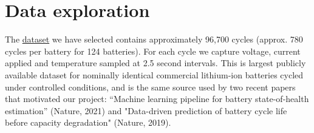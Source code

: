 \documentclass{article}
\begin{document}
\section{Data exploration}
The \href{https://data.matr.io/1/projects/5c48dd2bc625d700019f3204}{dataset} we have selected contains approximately 96,700 cycles (approx. 780 cycles per battery for 124 batteries). For each cycle we capture voltage, current applied and temperature sampled at 2.5 second intervals. This is largest publicly available dataset for nominally identical commercial lithium-ion batteries cycled under controlled conditions, and is the same source used by two recent papers that motivated our project: “Machine learning pipeline for battery state-of-health estimation” (Nature, 2021)\cite{roman2021machine} and "Data-driven prediction of battery cycle life before capacity degradation" (Nature, 2019)\cite{severson2019data}.
\end{document}
